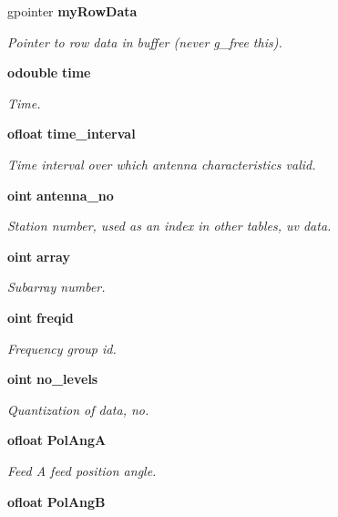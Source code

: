 \begin{CompactItemize}
gpointer {\bf my\-Row\-Data}
\begin{CompactList}\small\item\em Pointer to row data in buffer (never g\_\-free this). \item\end{CompactList}\item 
{\bf odouble} {\bf time}
\begin{CompactList}\small\item\em Time. \item\end{CompactList}\item 
{\bf ofloat} {\bf time\_\-interval}
\begin{CompactList}\small\item\em Time interval over which antenna characteristics valid. \item\end{CompactList}\item 
{\bf oint} {\bf antenna\_\-no}
\begin{CompactList}\small\item\em Station number, used as an index in other tables, uv data. \item\end{CompactList}\item 
{\bf oint} {\bf array}
\begin{CompactList}\small\item\em Subarray number. \item\end{CompactList}\item 
{\bf oint} {\bf freqid}
\begin{CompactList}\small\item\em Frequency group id. \item\end{CompactList}\item 
{\bf oint} {\bf no\_\-levels}
\begin{CompactList}\small\item\em Quantization of data, no. \item\end{CompactList}\item 
{\bf ofloat} {\bf Pol\-Ang\-A}
\begin{CompactList}\small\item\em Feed A feed position angle. \item\end{CompactList}\item 
{\bf ofloat} {\bf Pol\-Ang\-B}

\end{CompactItemize}
